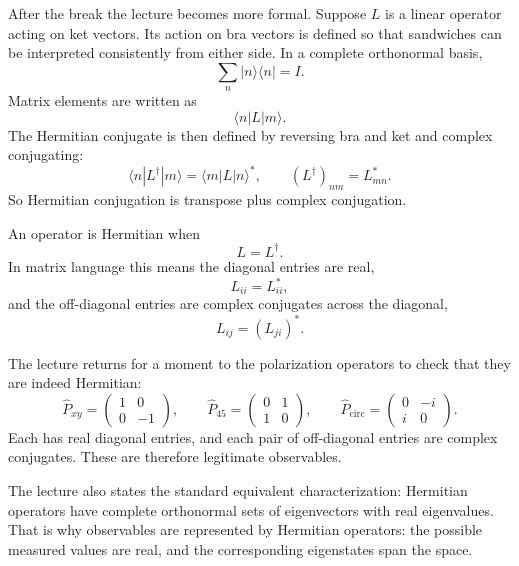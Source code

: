 After the break the lecture becomes more formal. Suppose $L$ is a linear operator acting on ket vectors. Its action on bra vectors is defined so that sandwiches can be interpreted consistently from either side. In a complete orthonormal basis,
\begin{equation}
\sum_n |n\rangle\langle n|=I.
\end{equation}
Matrix elements are written as
\begin{equation}
\langle n|L|m\rangle.
\end{equation}
The Hermitian conjugate is then defined by reversing bra and ket and complex conjugating:
\begin{equation}
\langle n|L^\dagger|m\rangle=\langle m|L|n\rangle^*,
\qquad
(L^\dagger)_{nm}=L_{mn}^*.
\end{equation}
So Hermitian conjugation is transpose plus complex conjugation.

An operator is Hermitian when
\begin{equation}
L=L^\dagger.
\end{equation}
In matrix language this means the diagonal entries are real,
\begin{equation}
L_{ii}=L_{ii}^*,
\end{equation}
and the off-diagonal entries are complex conjugates across the diagonal,
\begin{equation}
L_{ij}=(L_{ji})^*.
\end{equation}

The lecture returns for a moment to the polarization operators to check that they are indeed Hermitian:
\begin{equation}
\hat P_{xy}=
\begin{pmatrix}
1&0\\
0&-1
\end{pmatrix},
\qquad
\hat P_{45}=
\begin{pmatrix}
0&1\\
1&0
\end{pmatrix},
\qquad
\hat P_{\mathrm{circ}}=
\begin{pmatrix}
0&-i\\
i&0
\end{pmatrix}.
\end{equation}
Each has real diagonal entries, and each pair of off-diagonal entries are complex conjugates. These are therefore legitimate observables.

The lecture also states the standard equivalent characterization: Hermitian operators have complete orthonormal sets of eigenvectors with real eigenvalues. That is why observables are represented by Hermitian operators: the possible measured values are real, and the corresponding eigenstates span the space.

